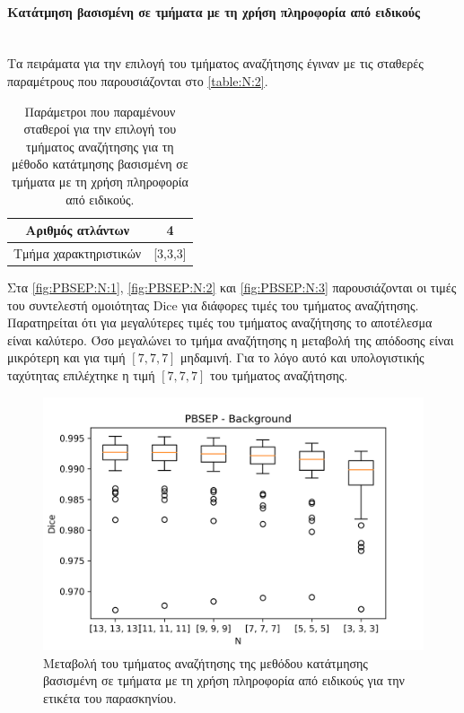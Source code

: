 \documentclass[a4paper,12pt]{article}
\newcommand{\paragraphLine}[1]{\paragraph{#1}\mbox{}\\}
\begin{document}
\paragraphLine{Κατάτμηση βασισμένη σε τμήματα με τη χρήση πληροφορία από
               ειδικούς}

Τα πειράματα για την επιλογή του τμήματος αναζήτησης έγιναν με τις σταθερές
παραμέτρους που παρουσιάζονται στο \autoref{table:N:2}.

\begin{table}[h!]
    \centering
    \begin{tabular}{|c|c|} 
        \hline
        Αριθμός ατλάντων & 4 \\ 
        \hline
        Τμήμα χαρακτηριστικών & [3,3,3] \\ 
        \hline
    \end{tabular}
    \caption{Παράμετροι που παραμένουν σταθεροί για την επιλογή του τμήματος
             αναζήτησης για τη μέθοδο κατάτμησης βασισμένη σε τμήματα με τη
             χρήση πληροφορία από ειδικούς.}
    \label{table:N:2}
\end{table}

Στα \autoref{fig:PBSEP:N:1}, \autoref{fig:PBSEP:N:2} και \autoref{fig:PBSEP:N:3}
παρουσιάζονται οι τιμές του συντελεστή ομοιότητας Dice για διάφορες τιμές του
τμήματος αναζήτησης. Παρατηρείται ότι για μεγαλύτερες τιμές του τμήματος
αναζήτησης το αποτέλεσμα είναι καλύτερο. Όσο μεγαλώνει το τμήμα αναζήτησης η
μεταβολή της απόδοσης είναι μικρότερη και για τιμή $[7,7,7]$ μηδαμινή. Για το
λόγο αυτό και υπολογιστικής ταχύτητας επιλέχτηκε η τιμή $[7,7,7]$ του τμήματος
αναζήτησης.

\begin{figure}[H]
    \centering
    \includegraphics[width=0.85\linewidth]{PBSEP_N_Background_plot.png}
    \caption{Μεταβολή του τμήματος αναζήτησης της μεθόδου κατάτμησης βασισμένη
             σε τμήματα με τη χρήση πληροφορία από ειδικούς για την ετικέτα του
             παρασκηνίου.}
    \label{fig:PBSEP:N:1}
\end{figure}
\end{document}
